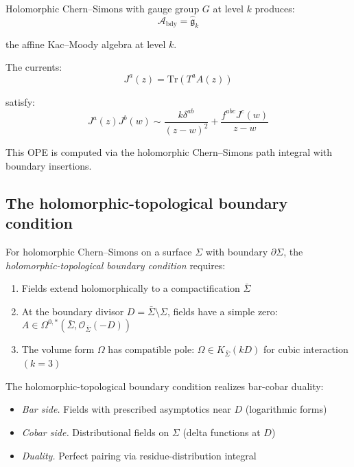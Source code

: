 \begin{example}
Holomorphic Chern--Simons with gauge group $G$ at level $k$ produces:
\[\mathcal{A}_{\text{bdy}} = \widehat{\mathfrak{g}}_k\]

the affine Kac--Moody algebra at level $k$.

The currents:
\[J^a(z) = \text{Tr}(T^a A(z))\]

satisfy:
\[J^a(z) J^b(w) \sim \frac{k \delta^{ab}}{(z-w)^2} +
\frac{f^{abc} J^c(w)}{z-w}\]

This OPE is computed via the holomorphic Chern--Simons path integral with
boundary insertions.
\end{example}

\subsection{The holomorphic-topological boundary condition}

\begin{definition}
For holomorphic Chern--Simons on a surface $\Sigma$ with boundary $\partial \Sigma$,
the \emph{holomorphic-topological boundary condition} requires:
\begin{enumerate}
\item Fields extend holomorphically to a compactification $\bar{\Sigma}$
\item At the boundary divisor $D = \bar{\Sigma} \setminus \Sigma$, fields have
a simple zero: $A \in \Omega^{0,*}(\bar{\Sigma}, \mathcal{O}_{\bar{\Sigma}}(-D))$
\item The volume form $\Omega$ has compatible pole: $\Omega \in K_{\bar{\Sigma}}(kD)$
for cubic interaction $(k=3)$
\end{enumerate}
\end{definition}

\begin{remark}
\label{rem:bar-cobar-ht-boundary}
The holomorphic-topological boundary condition realizes bar-cobar duality:
\begin{itemize}
\item \emph{Bar side.} Fields with prescribed asymptotics near $D$ (logarithmic
forms)
\item \emph{Cobar side.} Distributional fields on $\Sigma$ (delta functions at $D$)
\item \emph{Duality.} Perfect pairing via residue-distribution integral
\end{itemize}
\end{remark}

